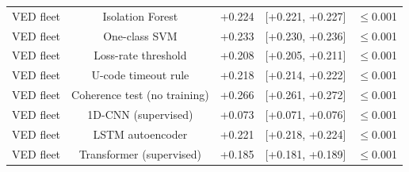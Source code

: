 \documentclass[10pt]{article}
\begin{document}
\begin{table}[!htbp]
{\begin{tabular}{@{}lcccc@{}}
VED fleet & Isolation Forest & +0.224 & [+0.221, +0.227] & $\le$0.001 \\
VED fleet & One-class SVM & +0.233 & [+0.230, +0.236] & $\le$0.001 \\
VED fleet & Loss-rate threshold & +0.208 & [+0.205, +0.211] & $\le$0.001 \\
VED fleet & U-code timeout rule & +0.218 & [+0.214, +0.222] & $\le$0.001 \\
VED fleet & Coherence test (no training) & +0.266 & [+0.261, +0.272] & $\le$0.001 \\
VED fleet & 1D-CNN (supervised) & +0.073 & [+0.071, +0.076] & $\le$0.001 \\
VED fleet & LSTM autoencoder & +0.221 & [+0.218, +0.224] & $\le$0.001 \\
VED fleet & Transformer (supervised) & +0.185 & [+0.181, +0.189] & $\le$0.001 \\
\bottomrule
\end{tabular}}
\end{table}
\end{document}
